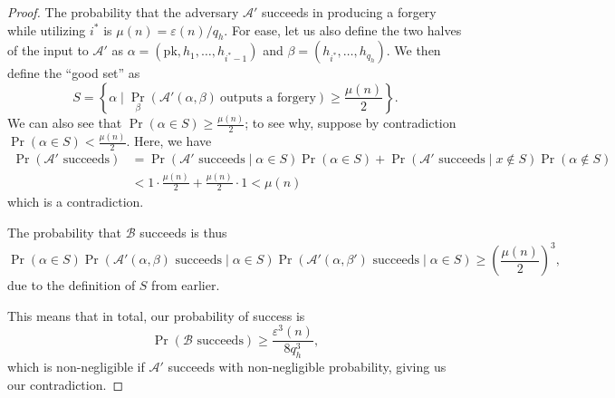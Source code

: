 \begin{proof}
    The probability that the adversary $\mathcal{A}'$ succeeds in producing a forgery while utilizing $i^*$ is $\mu(n) = \varepsilon(n) / q_h$. For ease, let us also define the two halves of the input to $\mathcal{A}'$ as $\alpha = (\mathrm{pk}, h_1, \ldots, h_{i^* - 1})$ and $\beta = (h_{i^*}, \ldots, h_{q_h})$. We then define the ``good set'' as
    \[
        S = \left\{\alpha \mid \Pr_{\beta}(\mathcal{A}'(\alpha, \beta)\ \text{outputs a forgery}) \ge \frac{\mu(n)}{2}\right\}
        .\]
    We can also see that $\Pr(\alpha \in S) \ge \frac{\mu(n)}{2}$; to see why, suppose by contradiction $\Pr(\alpha \in S) < \frac{\mu(n)}{2}$. Here, we have
    \begin{align*}
        \Pr(\text{$\mathcal{A}'$ succeeds}) & = \Pr(\text{$\mathcal{A}'$ succeeds} \mid \alpha \in S) \Pr(\alpha \in S) + \Pr(\text{$\mathcal{A}'$ succeeds} \mid x \notin S) \Pr(\alpha \notin S) \\
                                            & < 1 \cdot \frac{\mu(n)}{2} + \frac{\mu(n)}{2} \cdot 1 < \mu(n)
    \end{align*}
    which is a contradiction.

    The probability that $\mathcal{B}$ succeeds is thus
    \[
        \Pr(\alpha \in S) \Pr(\text{$\mathcal{A}'(\alpha, \beta)$ succeeds} \mid \alpha \in S) \Pr(\text{$\mathcal{A}'(\alpha, \beta')$ succeeds} \mid \alpha \in S)
        \ge \left(\frac{\mu(n)}{2}\right)^3
        ,\]
    due to the definition of $S$ from earlier.

    This means that in total, our probability of success is
    \[
        \Pr(\text{$\mathcal{B}$ succeeds}) \ge \frac{\varepsilon^3(n)}{8q_h^3}
        ,\]
    which is non-negligible if $\mathcal{A}'$ succeeds with non-negligible probability, giving us our contradiction.
\end{proof}
